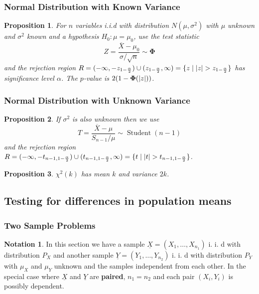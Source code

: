\documentclass[12pt]{article}
\newtheorem*{prop*}{Proposition}
\theoremstyle{definition}
\newtheorem*{not*}{Notation}
\DeclarePairedDelimiter\abs{\lvert}{\rvert}
\newcommand{\stdnorm}{\mathbf{\Phi}}
\DeclareMathOperator{\Student}{Student}
\begin{document}
\subsubsection{Normal Distribution with Known Variance}

\begin{prop*}
  For $n$ variables i.i.d with distribution $N(\mu, \sigma^2)$ with $\mu$ unknown and $\sigma^2$ known and a hypothesis $H_0 : \mu = \mu_0$, use the test statistic
  $$Z = \frac{\overline{X} - \mu_0}{\sigma / \sqrt{n}} \sim \stdnorm$$
  and the rejection region $R = (-\infty, -z_{1 - \frac{\alpha}{2}}) \cup (z_{1 - \frac{\alpha}{2}}, \infty) = \{z \mid \abs{z} > z_{1 - \frac{\alpha}{2}}\}$ has significance level $\alpha$.
  The $p$-value is $2(1 - \stdnorm(\abs{z}))$.
\end{prop*}

\subsubsection{Normal Distribution with Unknown Variance}

\begin{prop*}
  If $\sigma^2$ is also unknown then we use
  $$T = \frac{\overline{X} - \mu}{S_{n - 1} / \mu} \sim \Student(n - 1)$$
  and the rejection region $R = (-\infty, -t_{n - 1, 1 - \frac{\alpha}{2}}) \cup (t_{n - 1, 1 - \frac{\alpha}{2}}, \infty) = \{t \mid \abs{t} > t_{n - 1, 1 - \frac{\alpha}{2}}\}$.
\end{prop*}

\begin{prop*}
  $\chi^2(k)$ has mean $k$ and variance $2k$.
\end{prop*}

\subsection{Testing for differences in population means}

\subsubsection{Two Sample Problems}

\begin{not*}
  In this section we have a sample $\underline{X} = (X_1, \ldots, X_{n_1})$ i. i. d with distribution $P_X$ and another sample $\underline{Y} = (Y_1, \ldots, Y_{n_2})$ i. i. d with distribution $P_Y$ with $\mu_X$ and $\mu_Y$ unknown and the samples independent from each other.
  In the special case where $\underline{X}$ and $\underline{Y}$ are \textbf{paired}, $n_1 = n_2$ and each pair $(X_i, Y_i)$ is possibly dependent.
\end{not*}
\end{document}
